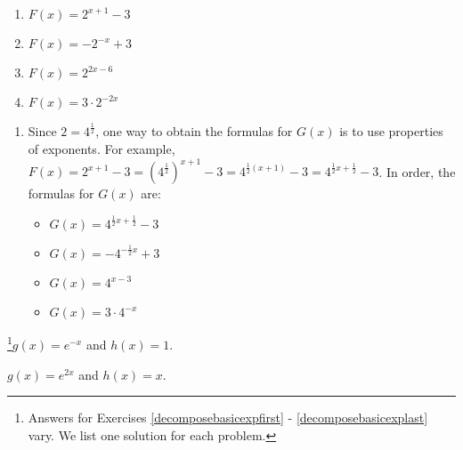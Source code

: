 \begin{multicols}{4}
\begin{enumerate}
\setcounter{enumi}{\value{HW}}

\item $F(x) = 2^{x+1}-3$

\item  $F(x) = -2^{-x} + 3$

\item $F(x) = 2^{2x-6}$

\item  $F(x) =3 \cdot 2^{-2x}$

\setcounter{HW}{\value{enumi}}
\end{enumerate}
\end{multicols}

\begin{enumerate}
\setcounter{enumi}{\value{HW}}

\item  Since $2 = 4^{\frac{1}{2}}$, one way to obtain the formulas for $G(x)$ is to use properties of exponents.  For example, $F(x) = 2^{x+1}-3 = \left(4^{\frac{1}{2}}\right)^{x+1} -3 = 4^{\frac{1}{2}(x+1)} - 3 = 4^{\frac{1}{2} x + \frac{1}{2}} - 3$.  In order, the formulas for $G(x)$ are:

\begin{multicols}{4}
\begin{itemize}

\item $G(x) = 4^{\frac{1}{2}x+\frac{1}{2}}-3$

\item  $G(x) = -4^{-\frac{1}{2} x} + 3$

\item $G(x) = 4^{x-3}$

\item  $G(x) =3 \cdot 4^{-x}$

\end{itemize}
\end{multicols}

\setcounter{HW}{\value{enumi}}
\end{enumerate}

\begin{enumerate}
\setcounter{enumi}{\value{HW}}

\addtocounter{enumi}{1}

\begin{multicols}{2}

\item\footnote{Answers for Exercises \ref{decomposebasicexpfirst} - \ref{decomposebasicexplast} vary.  We list one solution for each problem.}$g(x)  = e^{-x}$ and $h(x) = 1$.
\item $g(x) = e^{2x}$ and $h(x) = x$.

\end{multicols}

\setcounter{HW}{\value{enumi}}
\end{enumerate}

